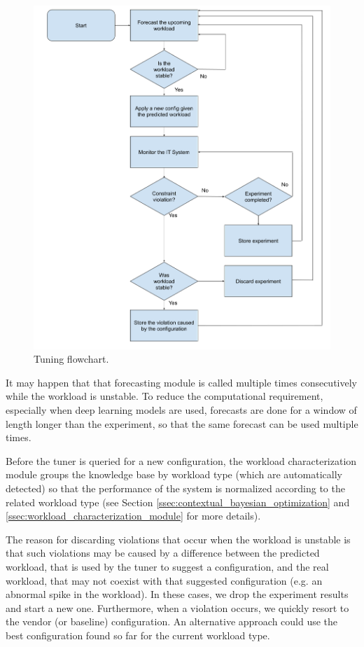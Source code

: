 \documentclass[a4paper, 12pt]{article} %
\begin{document}
	\begin{figure} \centering
		\includegraphics[width=\linewidth]{img/online_tuning_flowchart.png}
		\caption{Tuning flowchart.}
		\label{fig:online_tuning_flowchart}
	\end{figure}
	
	It may happen that that forecasting module is called multiple times consecutively while the workload is unstable. To reduce the computational requirement, especially when deep learning models are used, forecasts are done for a window of length longer than the experiment, so that the same forecast can be used multiple times.
	
	Before the tuner is queried for a new configuration, the workload characterization module groups the knowledge base by workload type (which are automatically detected) so that the performance of the system is normalized according to the related workload type (see Section \ref{ssec:contextual_bayesian_optimization} and \ref{ssec:workload_characterization_module} for more details).
	
	The reason for discarding violations that occur when the workload is unstable is that such violations may be caused by a difference between the predicted workload, that is used by the tuner to suggest a configuration, and the real workload, that may not coexist with that suggested configuration (e.g. an abnormal spike in the workload). In these cases, we drop the experiment results and start a new one. 
	Furthermore, when a violation occurs, we quickly resort to the vendor (or baseline) configuration. An alternative approach could use the best configuration found so far for the current workload type.
	
\end{document}
